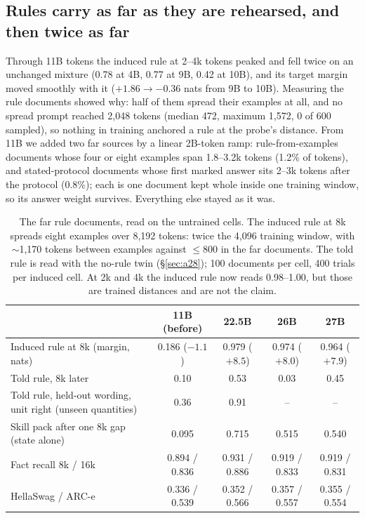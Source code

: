 \documentclass[11pt]{article}
\begin{document}
\subsection{Rules carry as far as they are rehearsed, and then twice as far}
\label{sec:far}
Through 11B tokens the induced rule at 2--4k tokens peaked and fell twice on an unchanged mixture (0.78 at 4B, 0.77 at 9B, 0.42 at 10B), and its target margin moved smoothly with it ($+1.86 \to -0.36$ nats from 9B to 10B). Measuring the rule documents showed why: half of them spread their examples at all, and no spread prompt reached 2,048 tokens (median 472, maximum 1,572, 0 of 600 sampled), so nothing in training anchored a rule at the probe's distance. From 11B we added two far sources by a linear 2B-token ramp: rule-from-examples documents whose four or eight examples span 1.8--3.2k tokens (1.2\% of tokens), and stated-protocol documents whose first marked answer sits 2--3k tokens after the protocol (0.8\%); each is one document kept whole inside one training window, so its answer weight survives. Everything else stayed as it was.

\begin{table}[t]\centering\small
\caption{The far rule documents, read on the untrained cells. The induced rule at 8k spreads eight examples over 8,192 tokens: twice the 4,096 training window, with $\sim$1,170 tokens between examples against $\le$800 in the far documents. The told rule is read with the no-rule twin (\S\ref{sec:a28}); 100 documents per cell, 400 trials per induced cell. At 2k and 4k the induced rule now reads 0.98--1.00, but those are trained distances and are not the claim.}
\label{tab:far}
\begin{tabular}{lcccc}\toprule
& 11B (before) & 22.5B & 26B & 27B \\\midrule
Induced rule at 8k (margin, nats) & 0.186 ($-1.1$) & 0.979 ($+8.5$) & 0.974 ($+8.0$) & 0.964 ($+7.9$) \\
Told rule, 8k later & 0.10 & 0.53 & 0.03 & 0.45 \\
Told rule, held-out wording, unit right (unseen quantities) & 0.36 & 0.91 & -- & -- \\
Skill pack after one 8k gap (state alone) & 0.095 & 0.715 & 0.515 & 0.540 \\
Fact recall 8k / 16k & 0.894 / 0.836 & 0.931 / 0.886 & 0.919 / 0.833 & 0.919 / 0.831 \\
HellaSwag / ARC-e & 0.336 / 0.539 & 0.352 / 0.566 & 0.357 / 0.557 & 0.355 / 0.554 \\
\bottomrule\end{tabular}\end{table}
\end{document}
